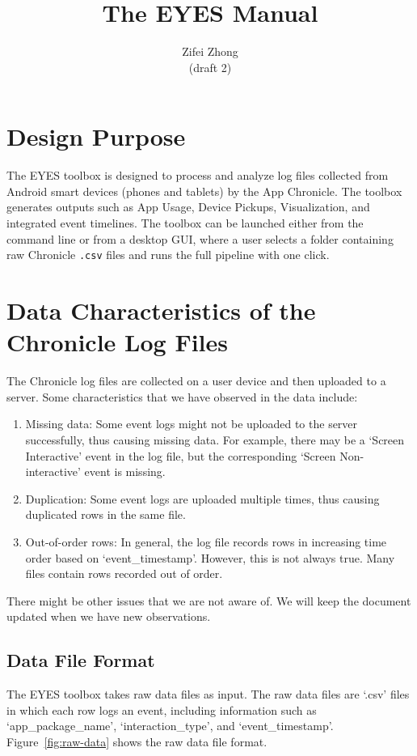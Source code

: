 \documentclass[11pt]{article}
\title{The EYES Manual}
\author{Zifei Zhong\\(draft 2)}
\begin{document}
\maketitle
\tableofcontents

\newpage
\section{Design Purpose}
The EYES toolbox is designed to process and analyze log files collected from Android smart devices (phones and tablets) by the App Chronicle. The toolbox generates outputs such as App Usage, Device Pickups, Visualization, and integrated event timelines. The toolbox can be launched either from the command line or from a desktop GUI, where a user selects a folder containing raw Chronicle \texttt{.csv} files and runs the full pipeline with one click.

\section{Data Characteristics of the Chronicle Log Files}
The Chronicle log files are collected on a user device and then uploaded to a server. Some characteristics that we have observed in the data include:
\begin{enumerate}
\item Missing data: Some event logs might not be uploaded to the server successfully, thus causing missing data. For example, there may be a `Screen Interactive' event in the log file, but the corresponding `Screen Non-interactive' event is missing.
\item Duplication: Some event logs are uploaded multiple times, thus causing duplicated rows in the same file.
\item Out-of-order rows: In general, the log file records rows in increasing time order based on `event\_timestamp'. However, this is not always true. Many files contain rows recorded out of order.
\end{enumerate}

There might be other issues that we are not aware of. We will keep the document updated when we have new observations.

 \subsection{Data File Format}
 The EYES toolbox takes raw data files as input. The raw data files are `.csv' files in which each row logs an event, including information such as `app\_package\_name', `interaction\_type', and `event\_timestamp'. Figure~\ref{fig:raw-data} shows the raw data file format.
\end{document}
